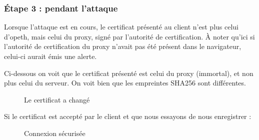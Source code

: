 \subsubsection{Étape 3 : pendant l'attaque}

Lorsque l'attaque est en cours, le certificat présenté au client n'est plus celui d'opeth, mais celui du proxy, signé par l'autorité de certification. À noter qu'ici si l'autorité de certification du proxy n'avait pas été présent dans le navigateur, celui-ci aurait émis une alerte.

Ci-dessous on voit que le certificat présenté est celui du proxy (immortal), et non plus celui du serveur. On voit bien que les empreintes SHA256 sont différentes.

\begin{figure}[H]
  \caption{Le certificat a changé}
\end{figure}

Si le certificat est accepté par le client et que nous essayons de nous enregistrer :

\begin{figure}[H]
  \caption{Connexion sécurisée}
\end{figure}

